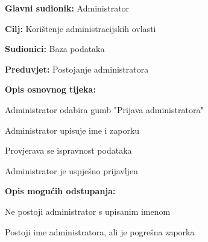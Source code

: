 			    
			   						\noindent {}
			   		\begin{packed_item}
			   			
			   			\item \textbf{Glavni sudionik: } Administrator
			   			\item  \textbf{Cilj:} Korištenje administracijskih ovlasti
			   			\item  \textbf{Sudionici:} Baza podataka
			   			\item  \textbf{Preduvjet:} Postojanje administratora 
			   			\item  \textbf{Opis osnovnog tijeka:}
			   			
			   			\item[] \begin{packed_enum}
			   				
			   				\item Administrator odabira gumb "Prijava administratora"
			   				\item Administrator upisuje ime i zaporku
			   				\item Provjerava se ispravnost podataka
			   				\item Administrator je uspješno prijavljen
			   			\end{packed_enum}
			   			
			   			\item  \textbf{Opis mogućih odstupanja:}
			   			
			   			\item[] \begin{packed_item}
			   				
			   				\item[2.b] 
			   				\item[] \begin{packed_enum}
			   					
			   					\item Ne postoji administrator s upisanim imenom
			   					\item Postoji ime administratora, ali je pogrešna zaporka
			   					
			   				\end{packed_enum}
			   				
			   			\end{packed_item}
			   		\end{packed_item}	
						
